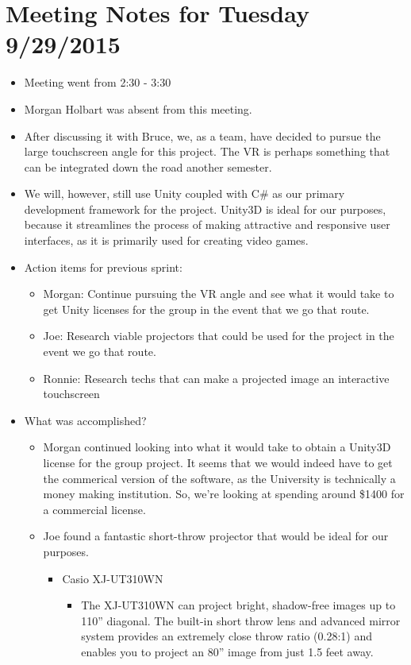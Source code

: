 \documentclass[]{article}
\begin{document}
\section{Meeting Notes for Tuesday 9/29/2015}
\begin{itemize}
	\item Meeting went from 2:30 - 3:30
	\item Morgan Holbart was absent from this meeting.
	\item After discussing it with Bruce, we, as a team, have decided to pursue the large touchscreen angle for this project. The VR is perhaps something that can be integrated down the road another semester. 
	\item We will, however, still use Unity coupled with C\# as our primary development framework for the project. Unity3D is ideal for our purposes, because it streamlines the process of making attractive and responsive user interfaces, as it is primarily used for creating video games. 
	\item Action items for previous sprint:
		\begin{itemize}
			\item Morgan: Continue pursuing the VR angle and see what it would take to get Unity licenses for the group in the event that we go that route.
			\item Joe: Research viable projectors that could be used for the project in the event we go that route.
			\item Ronnie: Research techs that can make a projected image an interactive touchscreen
		\end{itemize}
	\item What was accomplished?
		\begin{itemize}
			\item Morgan continued looking into what it would take to obtain a Unity3D license for the group project. It seems that we would indeed have to get the commerical version of the software, as the University is technically a money making institution. So, we're looking at spending around \$1400 for a commercial license. 
			\item Joe found a fantastic short-throw projector that would be ideal for our purposes. 
				\begin{itemize}
					\item Casio XJ-UT310WN
						\begin{itemize}
							\item The XJ-UT310WN can project bright, shadow-free images up to 110” diagonal. The built-in short throw lens and advanced mirror system provides an extremely close throw ratio (0.28:1) and enables you to project an 80” image from just 1.5 feet away.

\end{itemize}
\end{itemize}
\end{itemize}
\end{itemize}
\end{document}
